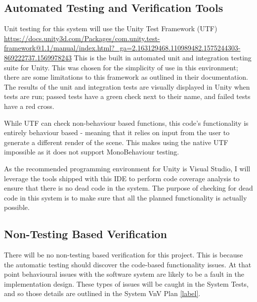 \documentclass[12pt, titlepage]{article}
\begin{document}
\subsection{Automated Testing and Verification Tools}\label{testingTools}
Unit testing for this system will use the Unity Test Framework (UTF) 
\url{https://docs.unity3d.com/Packages/com.unity.test-framework@1.1/manual/index.html?_ga=2.163129468.110989482.1575244303-869222737.1569978243}
This is the built in automated unit and integration testing suite for Unity. 
This was chosen for the simplicity of use in this environment; there are some 
limitations to this framework as outlined in their documentation. The results 
of the unit and integration tests are visually displayed in Unity when tests 
are run; passed tests have a green check next to their name, and failed tests 
have a red cross.

While UTF can check non-behaviour based functions, this code's functionality is 
entirely behaviour based - meaning that it relies on input from the user to 
generate a different render of the scene. This makes using the native UTF 
impossible as it does not support MonoBehaviour testing.

As the recommended programming environment for Unity is Visual Studio, I will 
leverage the tools shipped with this IDE to perform code coverage analysis to 
ensure that there is no dead code in the system. The purpose of checking for 
dead code in this system is to make sure that all the planned functionality is 
actually possible.


\subsection{Non-Testing Based Verification}
There will be no non-testing based verification for this project. This is 
because the automatic testing should discover the code-based functionality 
issues. At that point behavioural issues with the software system are likely to 
be a fault in the implementation design. These types of issues will be caught 
in the System Tests, and so those details are outlined in the System VnV Plan 
\ref{label}.
\end{document}

